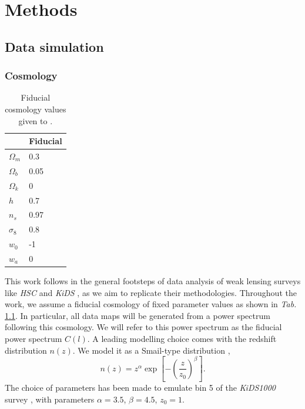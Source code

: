 \chapter{Methods}

\section{Data simulation}
\label{sec:data simulation}
\subsection{Cosmology}
\label{subsec:cosmology}

\begin{table}
\centering
\caption{\label{tab:fiducial_cosmology}Fiducial cosmology values given to .}
  \begin{tabular}{ll}
    \toprule
     & Fiducial \\
    \midrule
    $\Omega_m$ & 0.3 \\
    $\Omega_b$ & 0.05 \\
    $\Omega_k$ & 0 \\
    $h$ & 0.7 \\
    $n_s$ & 0.97 \\
    $\sigma_8$ & 0.8 \\
    $w_0$ & -1 \\
    $w_a$ & 0 \\
    \bottomrule
  \end{tabular}
\end{table} 
This work follows in the general footsteps of data analysis of weak lensing surveys like \textit{HSC} \cite{cosmology:hsc} and \textit{KiDS} \cite{cosmology:kids450}\cite{cosmology:kids1000}, as we aim to replicate their methodologies.
Throughout the work, we assume a fiducial cosmology of fixed parameter values as shown in \textit{Tab. }\ref{tab:fiducial_cosmology}. In particular, all data maps will be generated from a power spectrum following this cosmology. We will refer to this power spectrum as the fiducial power spectrum $C(l)$. A leading modelling choice comes with the redshift distribution $n(z)$. We model it as a Smail-type distribution \cite{smail}\cite{smail2},
\begin{equation}
    n(z)=z^\alpha \exp{\left[-\left(\frac{z}{z_0}\right)^\beta\right]}.
\end{equation}
The choice of parameters has been made to emulate bin 5 of the \textit{KiDS1000} survey \cite{cosmology:kids1000_bins}, with parameters $\alpha=3.5$, $\beta=4.5$, $z_0=1$. 

